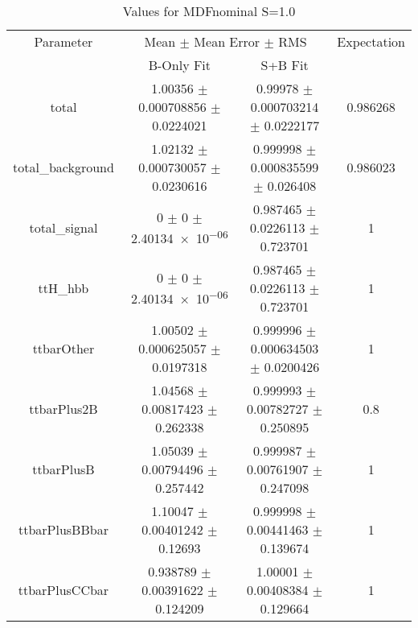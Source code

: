 \begin{table}
\centering
\caption{Values for MDFnominal S=1.0}
\begin{tabular}{cccc}
\toprule
Parameter & \multicolumn{2}{c}{Mean $\pm$ Mean Error $\pm$ RMS} & Expectation\\
 & B-Only Fit & S+B Fit & \\
\midrule
total & \num{1.00356} $\pm$ \num{0.000708856} $\pm$ \num{0.0224021} & \num{0.99978} $\pm$ \num{0.000703214} $\pm$ \num{0.0222177} & \num{0.986268}\\
total\_background & \num{1.02132} $\pm$ \num{0.000730057} $\pm$ \num{0.0230616} & \num{0.999998} $\pm$ \num{0.000835599} $\pm$ \num{0.026408} & \num{0.986023}\\
total\_signal & \num{0} $\pm$ \num{0} $\pm$ \num{2.40134e-06} & \num{0.987465} $\pm$ \num{0.0226113} $\pm$ \num{0.723701} & \num{1}\\
ttH\_hbb & \num{0} $\pm$ \num{0} $\pm$ \num{2.40134e-06} & \num{0.987465} $\pm$ \num{0.0226113} $\pm$ \num{0.723701} & \num{1}\\
ttbarOther & \num{1.00502} $\pm$ \num{0.000625057} $\pm$ \num{0.0197318} & \num{0.999996} $\pm$ \num{0.000634503} $\pm$ \num{0.0200426} & \num{1}\\
ttbarPlus2B & \num{1.04568} $\pm$ \num{0.00817423} $\pm$ \num{0.262338} & \num{0.999993} $\pm$ \num{0.00782727} $\pm$ \num{0.250895} & \num{0.8}\\
ttbarPlusB & \num{1.05039} $\pm$ \num{0.00794496} $\pm$ \num{0.257442} & \num{0.999987} $\pm$ \num{0.00761907} $\pm$ \num{0.247098} & \num{1}\\
ttbarPlusBBbar & \num{1.10047} $\pm$ \num{0.00401242} $\pm$ \num{0.12693} & \num{0.999998} $\pm$ \num{0.00441463} $\pm$ \num{0.139674} & \num{1}\\
ttbarPlusCCbar & \num{0.938789} $\pm$ \num{0.00391622} $\pm$ \num{0.124209} & \num{1.00001} $\pm$ \num{0.00408384} $\pm$ \num{0.129664} & \num{1}\\
\bottomrule
\end{tabular}
\end{table}